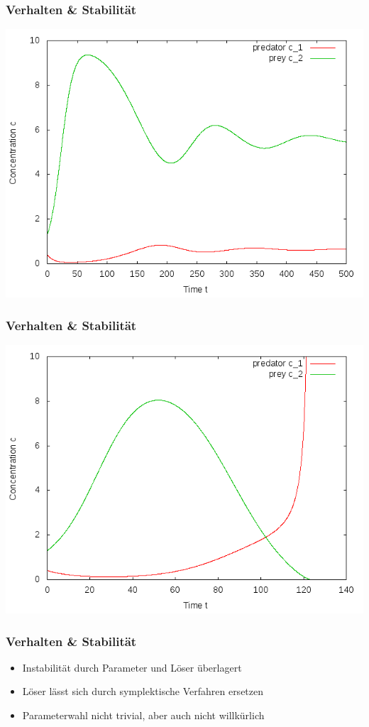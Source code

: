 \documentclass[12pt]{beamer}
\begin{document}
    \begin{frame}
    \frametitle{Verhalten \& Stabilität}
    \includegraphics[scale=0.5]{Bilder/n2_ged_schwingungen.png}
    \end{frame}
    
    \begin{frame}
    \frametitle{Verhalten \& Stabilität}
    \includegraphics[scale=0.5]{Bilder/n2_explodiert.png}
    \end{frame}
    
    \begin{frame}
    \frametitle{Verhalten \& Stabilität}
    \begin{itemize}
      \item Instabilität durch Parameter und Löser überlagert
      \item Löser lässt sich durch symplektische Verfahren ersetzen
      \item Parameterwahl nicht trivial, aber auch nicht willkürlich
    \end{itemize}
    \end{frame}
    
\end{document}
